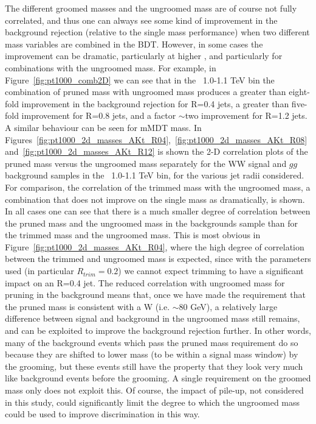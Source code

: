 The different groomed masses and the ungroomed mass are of course not
fully correlated, and thus one can always see some kind of improvement
in the background rejection (relative to the single mass performance) when two different mass variables are combined
in the BDT. However, in some cases the improvement can be dramatic,
particularly at higher \pt, and particularly for combinations with the
ungroomed mass. For example, in Figure~\ref{fig:pt1000_comb2D} we can
see that in the \pt~1.0-1.1 TeV bin the combination of pruned mass with
ungroomed mass produces a greater than eight-fold improvement in the
background rejection for R=0.4 jets, a greater than five-fold
improvement for R=0.8 jets, and a factor $\sim$two improvement for
R=1.2 jets. A similar behaviour can be seen for mMDT mass. 
In Figures~\ref{fig:pt1000_2d_masses_AKt_R04},~\ref{fig:pt1000_2d_masses_AKt_R08}
and~\ref{fig:pt1000_2d_masses_AKt_R12} is shown the 2-D correlation plots of the pruned mass versus the
ungroomed mass separately for the WW signal and $gg$ background
samples in the \pt~1.0-1.1 TeV bin, for the various jet radii
considered. For comparison, the correlation of the trimmed mass with
the ungroomed mass, a combination that does not improve on the single
mass as dramatically, is shown. In all cases one can see that there is
a much smaller degree of correlation between the pruned mass and the
ungroomed mass in the backgrounds sample than for the trimmed mass and the ungroomed mass. This
is most obvious in Figure~\ref{fig:pt1000_2d_masses_AKt_R04}, where
the high degree of correlation between the trimmed and ungroomed mass
is expected, since with the parameters used (in particular
$R_{trim} = 0.2$) we cannot expect trimming to have a significant
impact on an R=0.4 jet. The reduced correlation with ungroomed mass
for pruning in the background means that, once we have made the requirement that the
pruned mass is consistent with a W (i.e. $\sim$80 GeV), a relatively large difference
between signal and background in the ungroomed mass still remains, and
can be exploited to improve the background rejection further. In other
words, many of the background events which pass the pruned mass
requirement do so because they are shifted to lower mass (to be within
a signal mass window) by the grooming, but these events still have the
property that they look very much like background events before the
grooming. A single requirement on the groomed mass only does not
exploit this. Of course, the impact of pile-up, not considered in this
study, could significantly limit the degree to which the ungroomed
mass could be used to improve discrimination in this way. 

